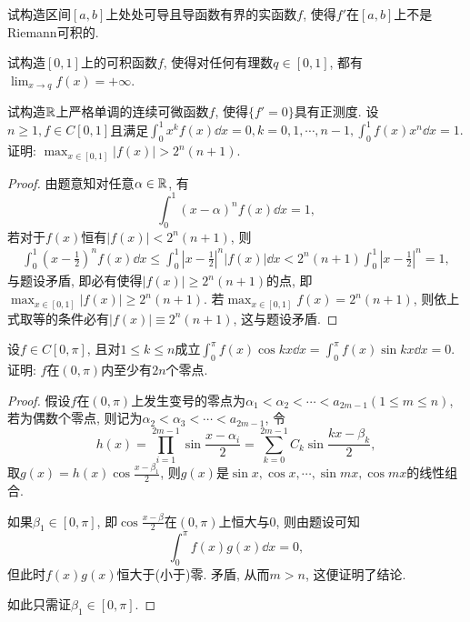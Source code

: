 \begin{quizb}
\woe 试构造区间\([a,b]\)上处处可导且导函数有界的实函数\(f\), 使得\(f'\)在\([a,b]\)上不是Riemann可积的.
\begin{solution}
    
\end{solution}
\woe 试构造\([0,1]\)上的可积函数\(f\), 使得对任何有理数\(q\in[0,1]\), 都有\(\lim_{x\rightarrow q}f(x)=+\infty\).
\begin{solution}
    
\end{solution}
\woe 试构造\(\mathbb{R}\)上严格单调的连续可微函数\(f\), 使得\(\{f'=0\}\)具有正测度.
\woe 设\(n\geqslant 1, f\in C[0,1]\)且满足\(\int_{0}^{1}x^kf(x)\dd x=0,k=0,1,\cdots,n-1,\int_{0}^{1}f(x)x^n\dd x=1.\) 证明: \(\max_{x\in[0,1]}|f(x)|>2^n(n+1)\).
\begin{proof}
由题意知对任意\(\alpha\in\mathbb{R}\), 有\[\int_{0}^{1}\left(x-\alpha\right)^nf(x)\dd x=1,\]若对于\(f(x)\)恒有\(|f(x)|<2^n(n+1)\), 则\[\begin{split}
\int_{0}^{1}\left(x-\frac{1}{2}\right)^nf(x)\dd x\leqslant\int_{0}^{1}\left|x-\frac{1}{2}\right|^n|f(x)|\dd x<2^n(n+1)\int_{0}^{1}\left|x-\frac{1}{2}\right|^n=1,
\end{split}\]与题设矛盾, 即必有使得\(|f(x)|\geqslant 2^n(n+1)\)的点, 即\(\max_{x\in[0,1]}|f(x)|\geqslant 2^n(n+1)\). 若\(\max_{x\in[0,1]}f(x)=2^n(n+1)\), 则依上式取等的条件必有\(|f(x)|\equiv 2^n(n+1)\), 这与题设矛盾.
\end{proof}
\woe 设\(f\in C[0,\pi]\), 且对\(1\leqslant k\leqslant n\)成立\(\int_{0}^{\pi}f(x)\cos kx\dd x=\int_{0}^{\pi}f(x)\sin kx\dd x=0\). 证明: \(f\)在\((0,\pi)\)内至少有\(2n\)个零点.
\begin{proof}
假设\(f\)在\((0,\pi)\)上发生变号的零点为\(\alpha_1<\alpha_2<\cdots<a_{2m-1}(1\leqslant m\leqslant n)\), 若为偶数个零点, 则记为\(\alpha_2<\alpha_3<\cdots<a_{2m-1}\), 令\[h(x)=\prod_{i=1}^{2m-1}\sin\frac{x-\alpha_i}{2}=\sum_{k=0}^{2m-1}C_k\sin\frac{kx-\beta_k}{2},\]
取\(g(x)=h(x)\cos\frac{x-\beta_1}{2}\), 则\(g(x)\)是\(\sin x,\cos x,\cdots,\sin mx,\cos mx\)的线性组合. 

如果\(\beta_1\in[0,\pi]\), 即\(\cos\frac{x-\beta}{2}\)在\((0,\pi)\)上恒大与0, 则由题设可知\[\int_{0}^{\pi}f(x)g(x)\dd x=0,\]但此时\(f(x)g(x)\)恒大于(小于)零. 矛盾, 从而\(m>n\), 这便证明了结论.

如此只需证\(\beta_1\in[0,\pi]\).


\end{proof}
\end{quizb}
